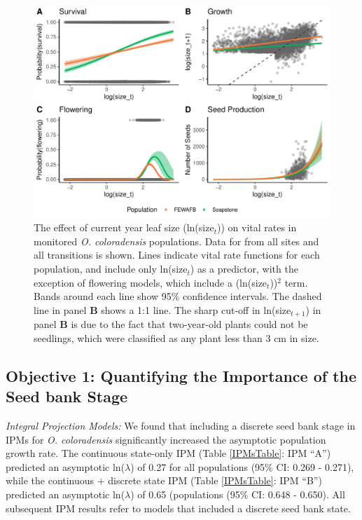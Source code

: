 \documentclass[12pt, letterpaper]{article}
\begin{document}
\begin{figure}[h]
  \centering
  \includegraphics[width=\textwidth]{figures/vitalRateModelFit.pdf}
  \caption{The effect of current year leaf size (ln(size$_t$)) on vital rates in monitored \textit{O. coloradensis} populations. Data for from all sites and all transitions is shown. Lines indicate vital rate functions for each population, and include only ln(size$_t$) as a predictor, with the exception of flowering models, which include a (ln(size$_t$))$^2$ term. Bands around each line show 95\% confidence intervals. The dashed line in panel \textbf{B} shows a 1:1 line. The sharp cut-off in ln(size$_{t+1}$) in panel \textbf{B} is due to the fact that two-year-old plants could not be seedlings, which were classified as any plant less than 3 cm in size.}
  \label{fig:vitalRates}
\end{figure} 

\subsection{Objective 1: Quantifying the Importance of the Seed bank Stage}

\textit{Integral Projection Models:} We found that including a discrete seed bank stage in IPMs for \textit{O. coloradensis} significantly increased the asymptotic population growth rate. The continuous state-only IPM (Table \ref{IPMsTable}: IPM “A”) predicted an asymptotic ln($\lambda$) of 0.27 for all populations (95\% CI: 0.269 - 0.271), while the continuous + discrete state IPM (Table \ref{IPMsTable}: IPM “B”) predicted an asymptotic ln($\lambda$) of 0.65 (populations (95\% CI: 0.648 - 0.650). All subsequent IPM results refer to models that included a discrete seed bank state. 
\end{document}
